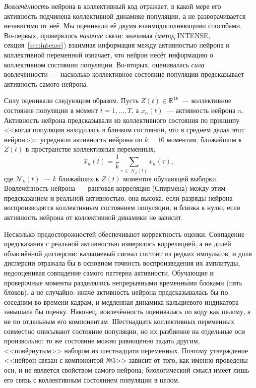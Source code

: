 \emph{Вовлечённость} нейрона в коллективный код отражает, в какой мере его активность подчинена коллективной динамике популяции, а не разворачивается независимо от неё. Мы оценивали её двумя взаимодополняющими способами. Во-первых, проверялось \textit{наличие} связи: значимая (метод INTENSE, секция~\ref{sec:intense}) взаимная информация между активностью нейрона и коллективной переменной означает, что нейрон несёт информацию о коллективном состоянии популяции. Во-вторых, оценивалась \textit{сила} вовлечённости~--- насколько коллективное состояние популяции предсказывает активность самого нейрона.

Силу оценивали следующим образом. Пусть $Z(t)\in\mathbb{R}^{16}$~--- коллективное состояние популяции в момент $t = 1,\dots,T$, а $x_n(t)$~--- активность нейрона $n$. Активность нейрона предсказывали из коллективного состояния по принципу <<когда популяция находилась в близком состоянии, что в среднем делал этот нейрон>>: усредняли активность нейрона по $k = 10$ моментам, ближайшим к $Z(t)$ в пространстве коллективных переменных,
\begin{equation}
\hat{x}_n(t) = \frac{1}{k}\sum_{\tau\,\in\,\mathcal{N}_k(t)} x_n(\tau),
\label{eq:knn_pred}
\end{equation}
где $\mathcal{N}_k(t)$~--- $k$ ближайших к $Z(t)$ моментов обучающей выборки. Вовлечённость нейрона~--- ранговая корреляция (Спирмена) между этим предсказанием и реальной активностью: она высока, если разряды нейрона воспроизводятся коллективным состоянием популяции, и близка к нулю, если активность нейрона от коллективной динамики не зависит.

Несколько предосторожностей обеспечивают корректность оценки. Совпадение предсказания с реальной активностью измерялось корреляцией, а не долей объяснённой дисперсии: кальциевый сигнал состоит из редких импульсов, и доля дисперсии отражала бы в основном точность воспроизведения их амплитуды, недооценивая совпадение самого паттерна активности. Обучающие и проверочные моменты разделялись непрерывными временны́ми блоками (пять блоков), а не случайно: иначе активность нейрона предсказывалась бы по соседним во времени кадрам, и медленная динамика кальциевого индикатора завышала бы оценку. Наконец, вовлечённость оценивалась по коду как целому, а не по отдельным его компонентам. Шестнадцать коллективных переменных совместно описывают состояние популяции, но их разбиение на отдельные оси произвольно: то же состояние можно равноценно задать другим, <<повёрнутым>> набором из шестнадцати переменных. Поэтому утверждение <<нейрон связан с компонентой №3>> зависит от того, как именно проведены оси, и не является свойством самого нейрона; биологический смысл имеет лишь его связь с коллективным состоянием популяции в целом.

